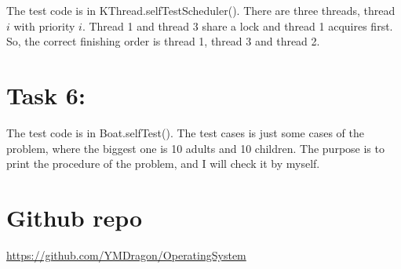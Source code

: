 \documentclass[11pt]{article}
\begin{document}
\begin{spacing}{1.1}
The test code is in KThread.selfTestScheduler(). There are three threads, thread $i$ with priority $i$. Thread 1 and thread 3 share a lock and thread 1 acquires first. So, the correct finishing order is thread 1, thread 3 and thread 2. 

\section{Task 6:}

The test code is in Boat.selfTest(). The test cases is just some cases of the problem, where the biggest one is 10 adults and 10 children. The purpose is to print the procedure of the problem, and I will check it by myself.

\section{Github repo}

\url{https://github.com/YMDragon/OperatingSystem}


\end{spacing}
\end{document}
